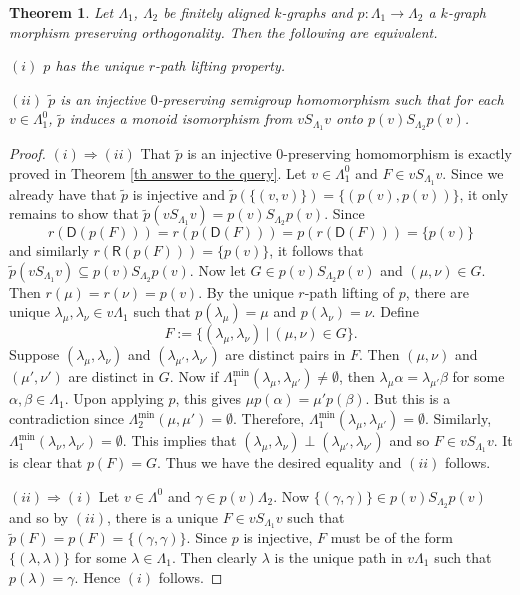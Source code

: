 \documentclass[a4paper,reqno,11pt]{amsart}
\numberwithin{equation}{section}
\newtheorem{thm}{Theorem}[section]
\theoremstyle{definition}
\theoremstyle{remark}
\begin{document}
\begin{thm}\label{th local submonoid preservation}
Let $\Lambda_1$, $\Lambda_2$ be finitely aligned $k$-graphs and $p:\Lambda_1\longrightarrow \Lambda_2$ a $k$-graph morphism preserving orthogonality. Then the following are equivalent.

$(i)$ $p$ has the unique $r$-path lifting property.

$(ii)$ $\tilde{p}$ is an injective $0$-preserving semigroup homomorphism such that for each $v\in \Lambda_1^0$, $\tilde{p}$ induces a monoid isomorphism from $vS_{\Lambda_1}v$ onto $p(v)S_{\Lambda_2}p(v)$. 
\end{thm}
\begin{proof}
$(i)\Rightarrow (ii)$ That $\tilde{p}$ is an injective $0$-preserving homomorphism is exactly proved in Theorem \ref{th answer to the query}. Let $v\in \Lambda_1^0$ and $F\in vS_{\Lambda_1}v$. Since we already have that $\tilde{p}$ is injective and $\tilde{p}(\{(v,v)\})=\{(p(v),p(v))\}$, it only remains to show that $\tilde{p}(vS_{\Lambda_1}v)=p(v)S_{\Lambda_2}p(v)$. Since \[r(\mathsf{D}(p(F)))=r(p(\mathsf{D}(F)))=p(r(\mathsf{D}(F)))=\{p(v)\}\] and similarly $r(\mathsf{R}(p(F)))=\{p(v)\}$, it follows that $\tilde{p}(vS_{\Lambda_1}v)\subseteq p(v)S_{\Lambda_2}p(v)$. Now let $G\in p(v)S_{\Lambda_2}p(v)$ and $(\mu,\nu)\in G$. Then $r(\mu)=r(\nu)=p(v)$. By the unique $r$-path lifting of $p$, there are unique $\lambda_\mu,\lambda_\nu\in v\Lambda_1$ such that $p(\lambda_\mu)=\mu$ and $p(\lambda_\nu)=\nu$. Define \[F:=\{(\lambda_\mu,\lambda_\nu)~|~(\mu,\nu)\in G\}.\] Suppose $(\lambda_\mu,\lambda_\nu)$ and $(\lambda_{\mu'},\lambda_{\nu'})$ are distinct pairs in $F$. Then $(\mu,\nu)$ and $(\mu',\nu')$ are distinct in $G$. Now if $\Lambda_1^{\min}(\lambda_\mu,\lambda_{\mu'})\neq \emptyset$, then $\lambda_\mu \alpha=\lambda_{\mu'}\beta$ for some $\alpha,\beta\in \Lambda_1$. Upon applying $p$, this gives $\mu p(\alpha)=\mu' p(\beta)$. But this is a contradiction since $\Lambda_2^{\min}(\mu,\mu')=\emptyset$. Therefore, $\Lambda_1^{\min}(\lambda_\mu,\lambda_{\mu'})=\emptyset$. Similarly, $\Lambda_1^{\min}(\lambda_\nu,\lambda_{\nu'})=\emptyset$. This implies that $(\lambda_\mu,\lambda_\nu)\perp (\lambda_{\mu'},\lambda_{\nu'})$ and so $F\in vS_{\Lambda_1}v$. It is clear that $p(F)=G$. Thus we have the desired equality and $(ii)$ follows.

$(ii)\Rightarrow (i)$ Let $v\in \Lambda^0$ and $\gamma\in p(v)\Lambda_2$. Now $\{(\gamma,\gamma)\}\in p(v)S_{\Lambda_2}p(v)$ and so by $(ii)$, there is a unique $F\in vS_{\Lambda_1}v$ such that $\tilde{p}(F)=p(F)=\{(\gamma,\gamma)\}$. Since $p$ is injective, $F$ must be of the form $\{(\lambda,\lambda)\}$ for some $\lambda\in \Lambda_1$. Then clearly $\lambda$ is the unique path in $v\Lambda_1$ such that $p(\lambda)=\gamma$. Hence $(i)$ follows. 
\end{proof}
\end{document}
